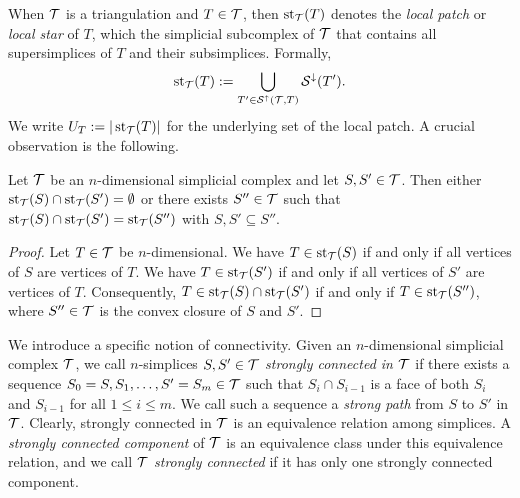 \documentclass[12pt,a4paper]{article}
\begin{document}
When ${\mathcal T}$ is a triangulation and $T \in {\mathcal T}$, then $\operatorname{st}_{{\mathcal T}}(T)$ denotes the \emph{local patch} or \textit{local star} of $T$, 
which the simplicial subcomplex of ${\mathcal T}$ that contains all supersimplices of $T$ and their subsimplices. Formally,
\begin{gather*}
    \operatorname{st}_{{\mathcal T}}(T) := \bigcup_{ T' \in {\mathcal S}^{\uparrow}({\mathcal T},T) } {\mathcal S}^{\downarrow}(T').
\end{gather*}
We write $U_T := | \operatorname{st}_{{\mathcal T}}(T) |$ for the underlying set of the local patch. 
A crucial observation is the following.  

\begin{lemma}
 Let ${\mathcal T}$ be an $n$-dimensional simplicial complex and let $S,S' \in {\mathcal T}$.
 Then either $\operatorname{st}_{{\mathcal T}}(S) \cap \operatorname{st}_{{\mathcal T}}(S') = \emptyset$ or there exists $S'' \in {\mathcal T}$
 such that $\operatorname{st}_{{\mathcal T}}(S) \cap \operatorname{st}_{{\mathcal T}}(S') = \operatorname{st}_{{\mathcal T}}(S'')$ with $S, S' \subseteq S''$.
\end{lemma}
\begin{proof}
 Let $T \in {\mathcal T}$ be $n$-dimensional.
 We have $T \in \operatorname{st}_{{\mathcal T}}(S )$ if and only if all vertices of $S $ are vertices of $T$.
 We have $T \in \operatorname{st}_{{\mathcal T}}(S')$ if and only if all vertices of $S'$ are vertices of $T$.
 Consequently, $T \in \operatorname{st}_{{\mathcal T}}(S) \cap \operatorname{st}_{{\mathcal T}}(S')$ if and only if $T \in \operatorname{st}_{{\mathcal T}}(S'')$,
 where $S'' \in {\mathcal T}$ is the convex closure of $S$ and $S'$.
\end{proof}

We introduce a specific notion of connectivity. 
Given an $n$-dimensional simplicial complex ${\mathcal T}$, 
we call $n$-simplices $S,S' \in {\mathcal T}$ \emph{strongly connected in ${\mathcal T}$} if there exists a sequence $S_0=S,S_1,\dots,S'=S_m \in {\mathcal T}$ such that $S_{i} \cap S_{i-1}$ is a face of both $S_{i}$ and $S_{i-1}$ for all $1 \leq i \leq m$. 
We call such a sequence a \emph{strong path} from $S$ to $S'$ in ${\mathcal T}$. 
Clearly, strongly connected in ${\mathcal T}$ is an equivalence relation among simplices. 
A \emph{strongly connected component} of ${\mathcal T}$ is an equivalence class under this equivalence relation, 
and we call ${\mathcal T}$ \emph{strongly connected} if it has only one strongly connected component. 
\end{document}
